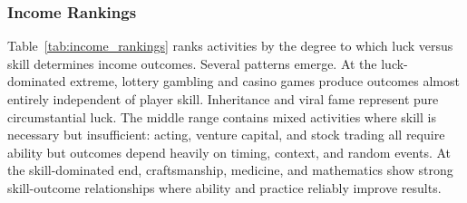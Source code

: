 \subsubsection{Income Rankings}

Table~\ref{tab:income_rankings} ranks activities by the degree to which
luck versus skill determines income outcomes. Several patterns emerge.
At the luck-dominated extreme, lottery gambling and casino games produce
outcomes almost entirely independent of player skill. Inheritance and
viral fame represent pure circumstantial luck. The middle range contains
mixed activities where skill is necessary but insufficient: acting, venture
capital, and stock trading all require ability but outcomes depend
heavily on timing, context, and random events. At the skill-dominated end,
craftsmanship, medicine, and mathematics show strong skill-outcome
relationships where ability and practice reliably improve results.

